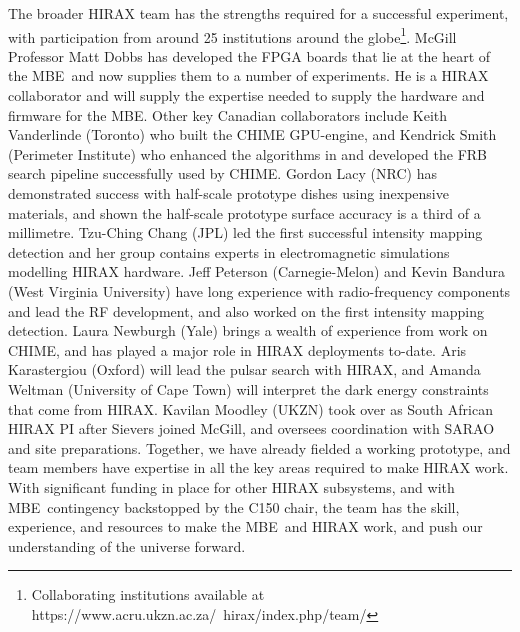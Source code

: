 \documentclass[letterpaper,11pt,preprint]{aastex}
\newcommand{\mbe}{{\rm MBE}}
\begin{document}
The broader HIRAX team has the strengths required for a successful
experiment, with participation from around 25 institutions around the
globe\footnote{Collaborating institutions available at
  https://www.acru.ukzn.ac.za/~hirax/index.php/team/}.  McGill
Professor Matt Dobbs has developed the FPGA boards that lie at the
heart of the \mbe\ and now supplies them to a number of experiments.
He is a HIRAX collaborator and will supply the expertise needed to
supply the hardware and firmware for the \mbe.  Other key Canadian
collaborators include Keith Vanderlinde (Toronto) who built the CHIME
GPU-engine, and Kendrick Smith (Perimeter Institute) who enhanced the
algorithms in \citet{Masui15} and developed the FRB search pipeline
successfully used by CHIME. Gordon Lacy (NRC) has demonstrated success
with half-scale prototype dishes using inexpensive materials, and
shown the half-scale prototype surface accuracy is a third of a
millimetre.  Tzu-Ching Chang (JPL) led the first successful intensity
mapping detection \citep{Chang10} and her group contains experts in
electromagnetic simulations modelling HIRAX hardware.  Jeff Peterson
(Carnegie-Melon) and Kevin Bandura (West Virginia University) have
long experience with radio-frequency components and lead the RF
development, and also worked on the first intensity mapping detection.
Laura Newburgh (Yale) brings a wealth of experience from work on
CHIME, and has played a major role in HIRAX deployments to-date.  Aris
Karastergiou (Oxford) will lead the pulsar search with HIRAX, and
Amanda Weltman (University of Cape Town) will interpret the dark
energy constraints that come from HIRAX.  Kavilan Moodley (UKZN) took
over as South African HIRAX PI after Sievers joined McGill, and
oversees coordination with SARAO and site preparations.  Together, we
have already fielded a working prototype, and team members have
expertise in all the key areas required to make HIRAX work.  With
significant funding in place for other HIRAX subsystems, and with
\mbe\ contingency backstopped by the C150 chair, the team has the
skill, experience, and resources to make the \mbe\ and HIRAX work, and
push our understanding of the universe forward.
\end{document}
